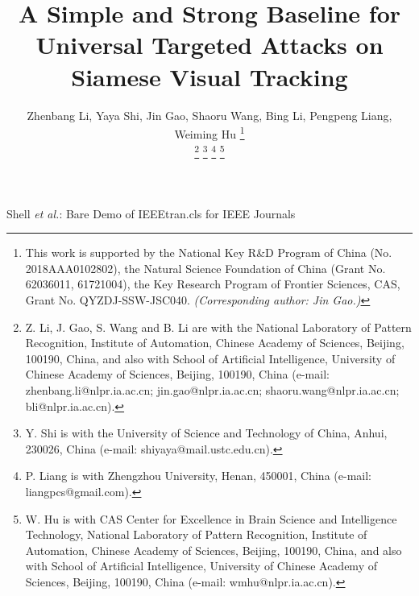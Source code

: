 \documentclass[journal]{IEEEtran}
\begin{document}
\title{A Simple and Strong Baseline for Universal Targeted Attacks on Siamese Visual Tracking}
\author{
  Zhenbang Li, Yaya Shi, Jin Gao, Shaoru Wang, Bing Li, Pengpeng Liang, Weiming Hu
  \thanks{This work is supported by the National Key R\&D Program of China (No. 2018AAA0102802), the Natural Science Foundation of China (Grant No. 62036011, 61721004), the Key Research Program of Frontier Sciences, CAS, Grant No. QYZDJ-SSW-JSC040. \textit{(Corresponding author: Jin Gao.)}}
  
  \thanks{Z. Li, J. Gao, S. Wang and B. Li are with the National Laboratory of Pattern Recognition, Institute of Automation, Chinese Academy of Sciences, Beijing, 100190, China, and also with School of Artificial Intelligence, University of Chinese Academy of Sciences, Beijing, 100190, China (e-mail: zhenbang.li@nlpr.ia.ac.cn; jin.gao@nlpr.ia.ac.cn; shaoru.wang@nlpr.ia.ac.cn; bli@nlpr.ia.ac.cn).}
  \thanks{Y. Shi is with the University of Science and Technology of China, Anhui, 230026, China (e-mail: shiyaya@mail.ustc.edu.cn).}
  \thanks{P. Liang is with Zhengzhou University, Henan, 450001, China (e-mail: liangpcs@gmail.com).}
  \thanks{W. Hu is with CAS Center for Excellence in Brain Science and Intelligence Technology, National Laboratory of Pattern Recognition, Institute of Automation, Chinese Academy of Sciences, Beijing, 100190, China, and also with School of Artificial Intelligence, University of Chinese Academy of Sciences, Beijing, 100190, China (e-mail: wmhu@nlpr.ia.ac.cn).}
}

{Shell \MakeLowercase{\textit{et al.}}: Bare Demo of IEEEtran.cls for IEEE Journals}
\maketitle
\end{document}
